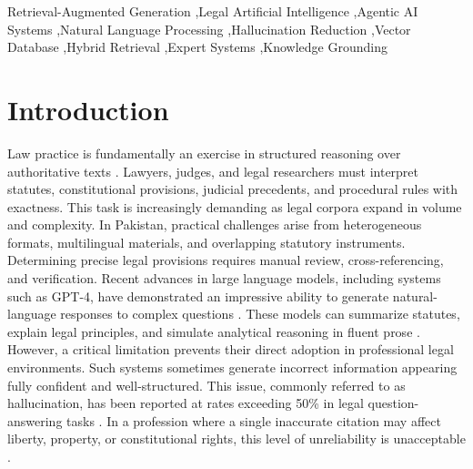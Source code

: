 \documentclass[a4paper,fleqn]{cas-dc}
\begin{document}
\begin{keywords}
Retrieval-Augmented Generation \sep Legal Artificial Intelligence \sep Agentic AI Systems \sep Natural Language Processing \sep Hallucination Reduction \sep Vector Database \sep Hybrid Retrieval \sep Expert Systems \sep Knowledge Grounding
\end{keywords}

\maketitle

\section{Introduction}
Law practice is fundamentally an exercise in structured reasoning over authoritative texts \citep{1}. Lawyers, judges, and legal researchers must interpret statutes, constitutional provisions, judicial precedents, and procedural rules with exactness. This task is increasingly demanding as legal corpora expand in volume and complexity. In Pakistan, practical challenges arise from heterogeneous formats, multilingual materials, and overlapping statutory instruments. Determining precise legal provisions requires manual review, cross-referencing, and verification. Recent advances in large language models, including systems such as GPT-4, have demonstrated an impressive ability to generate natural-language responses to complex questions \citep{2, 3}. These models can summarize statutes, explain legal principles, and simulate analytical reasoning in fluent prose \citep{4}. However, a critical limitation prevents their direct adoption in professional legal environments. Such systems sometimes generate incorrect information appearing fully confident and well-structured. This issue, commonly referred to as hallucination, has been reported at rates exceeding 50\% in legal question-answering tasks \citep{6, 8, 10, 14}. In a profession where a single inaccurate citation may affect liberty, property, or constitutional rights, this level of unreliability is unacceptable \citep{9, 10}.
\end{document}
